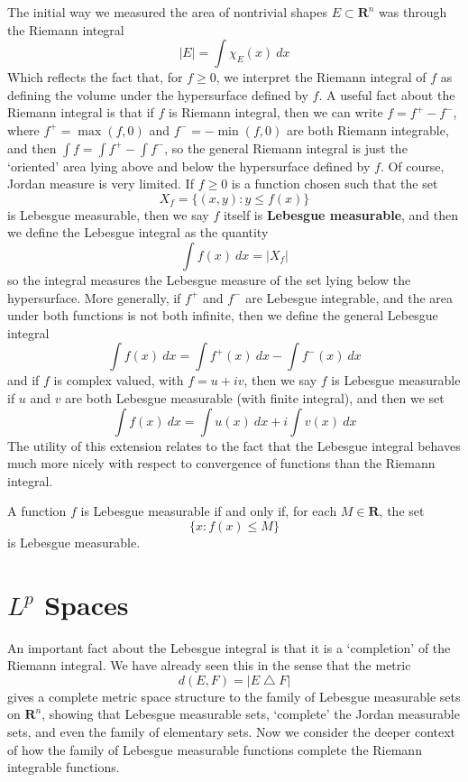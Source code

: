 The initial way we measured the area of nontrivial shapes $E \subset \mathbf{R}^n$ was through the Riemann integral
%
\[ |E| = \int \chi_E(x)\ dx \]
%
Which reflects the fact that, for $f \geq 0$, we interpret the Riemann integral of $f$ as defining the volume under the hypersurface defined by $f$. A useful fact about the Riemann integral is that if $f$ is Riemann integral, then we can write $f = f^+ - f^-$, where $f^+ = \max(f,0)$ and $f^- = -\min(f,0)$ are both Riemann integrable, and then $\int f = \int f^+ - \int f^-$, so the general Riemann integral is just the `oriented' area lying above and below the hypersurface defined by $f$. Of course, Jordan measure is very limited. If $f \geq 0$ is a function chosen such that the set
%
\[ X_f =  \{ (x,y): y \leq f(x) \} \]
%
is Lebesgue measurable, then we say $f$ itself is {\bf Lebesgue measurable}, and then we define the Lebesgue integral as the quantity
%
\[ \int f(x)\ dx = |X_f| \]
%
so the integral measures the Lebesgue measure of the set lying below the hypersurface. More generally, if $f^+$ and $f^-$ are Lebesgue integrable, and the area under both functions is not both infinite, then we define the general Lebesgue integral
%
\[ \int f(x)\ dx = \int f^+(x)\ dx - \int f^-(x)\ dx \]
%
and if $f$ is complex valued, with $f = u + iv$, then we say $f$ is Lebesgue measurable if $u$ and $v$ are both Lebesgue measurable (with finite integral), and then we set
%
\[ \int f(x)\ dx = \int u(x)\ dx + i \int v(x)\ dx \]
%
The utility of this extension relates to the fact that the Lebesgue integral behaves much more nicely with respect to convergence of functions than the Riemann integral.

\begin{theorem}
  A function $f$ is Lebesgue measurable if and only if, for each $M \in \mathbf{R}$, the set
  \[ \{ x: f(x) \leq M \} \]
  is Lebesgue measurable.
\end{theorem}

\section{$L^p$ Spaces}

An important fact about the Lebesgue integral is that it is a `completion' of the Riemann integral. We have already seen this in the sense that the metric
%
\[ d(E,F) = |E \bigtriangleup F| \]
%
gives a complete metric space structure to the family of Lebesgue measurable sets on $\mathbf{R}^n$, showing that Lebesgue measurable sets, `complete' the Jordan measurable sets, and even the family of elementary sets. Now we consider the deeper context of how the family of Lebesgue measurable functions complete the Riemann integrable functions.

